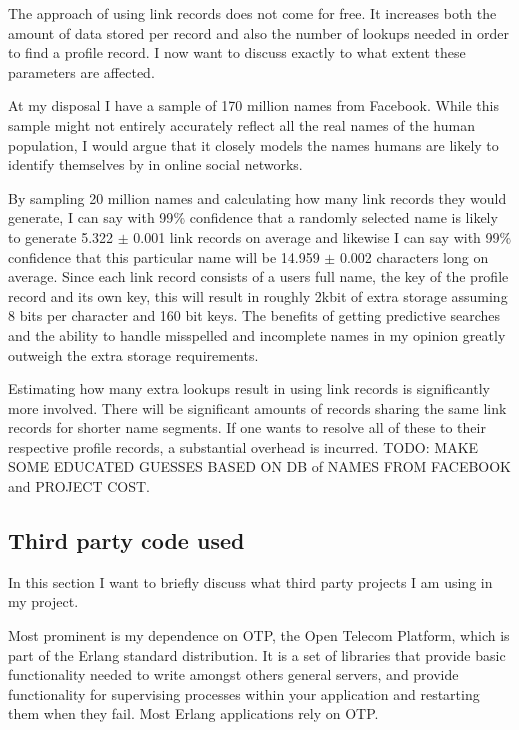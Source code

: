 The approach of using link records does not come for free. It increases both the amount of data stored per record and also the number of lookups needed in order to find a profile record. I now want to discuss exactly to what extent these parameters are affected.

At my disposal I have a sample of 170 million names from Facebook. While this sample might not entirely accurately reflect all the real names of the human population, I would argue that it closely models the names humans are likely to identify themselves by in online social networks.

By sampling 20 million names and calculating how many link records they would generate, I can say with 99$\%$ confidence that a randomly selected name is likely to generate 5.322 $\pm$ 0.001 link records on average and likewise I can say with 99$\%$ confidence that this particular name will be 14.959 $\pm$ 0.002 characters long on average.
Since each link record consists of a users full name, the key of the profile record and its own key, this will result in roughly 2kbit of extra storage assuming 8 bits per character and 160 bit keys. The benefits of getting predictive searches and the ability to handle misspelled and incomplete names in my opinion greatly outweigh the extra storage requirements.

Estimating how many extra lookups result in using link records is significantly more involved. There will be significant amounts of records sharing the same link records for shorter name segments. If one wants to resolve all of these to their respective profile records, a substantial overhead is incurred. TODO: MAKE SOME EDUCATED GUESSES BASED ON DB of NAMES FROM FACEBOOK and PROJECT COST.


\subsection{Third party code used}
In this section I want to briefly discuss what third party projects I am using in my project.

Most prominent is my dependence on OTP, the Open Telecom Platform, which is part of the Erlang standard distribution. It is a set of libraries that provide basic functionality needed to write amongst others general servers, and provide functionality for supervising processes within your application and restarting them when they fail. Most Erlang applications rely on OTP.


